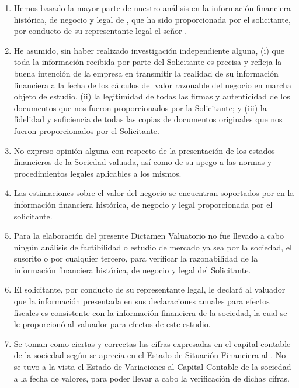 \begin{enumerate}
\begin{enumerate}
\begin{enumerate}
		\item Hemos basado la mayor parte de nuestro an\'alisis en la informaci\'on financiera hist\'orica, de negocio y legal de \textcolor{principal}{\empresaSolicitante}, que ha sido proporcionada por el solicitante, por conducto de su representante legal el se\~nor \textcolor{principal}{\personaSolicitante}.

		\item He asumido, sin haber realizado investigaci\'on independiente alguna, (i) que toda la informaci\'on recibida por parte del Solicitante es precisa y refleja la buena intenci\'on de la empresa en transmitir la realidad de su informaci\'on financiera a la fecha de los c\'alculos del valor razonable del negocio en marcha objeto de estudio. (ii) la legitimidad de todas las firmas y autenticidad de los documentos que nos fueron proporcionados por la Solicitante; y (iii) la fidelidad y suficiencia de todas las copias de documentos originales que nos fueron proporcionados por el Solicitante.

		\item No expreso opini\'on alguna con respecto de la presentaci\'on de los estados financieros de la Sociedad valuada, as\'i como de su apego a las normas y procedimientos legales aplicables a los mismos.

		\item Las estimaciones sobre el valor del negocio se encuentran soportados por en la informaci\'on financiera hist\'orica, de negocio y legal proporcionada por el solicitante. 

		\item Para la elaboraci\'on del presente Dictamen Valuatorio no fue llevado a cabo ning\'un an\'alisis de factibilidad o estudio de mercado ya sea por la sociedad, el suscrito o por cualquier tercero, para verificar la razonabilidad de la informaci\'on financiera hist\'orica, de negocio y legal del Solicitante.

		\item El solicitante, por conducto de su representante legal, le declar\'o al valuador que la informaci\'on presentada en sus declaraciones anuales para efectos fiscales es consistente con la informaci\'on financiera de la sociedad, la cual se le proporcion\'o al valuador para efectos de este estudio.

		\item Se toman como ciertas y correctas las cifras expresadas en el capital contable de la sociedad seg\'un se aprecia en el Estado de Situaci\'on Financiera al \textcolor{principal}{\fechaValores}.  No se tuvo a la vista el Estado de Variaciones al Capital Contable de la sociedad a la fecha de valores, para poder llevar a cabo la verificaci\'on de dichas cifras.


\end{enumerate}
\end{enumerate}
\end{enumerate}
